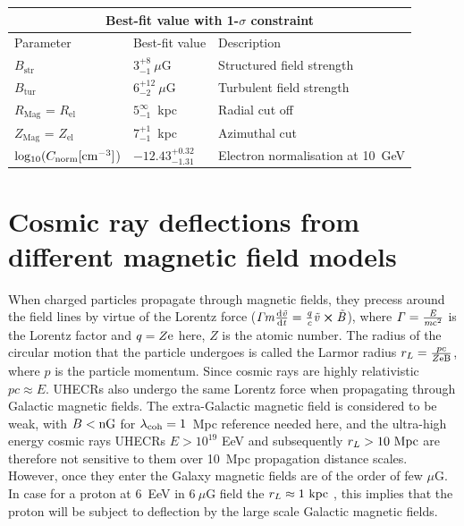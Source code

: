 \documentclass[12pt, a4 paper]{article}
\newcommand{\Andrew}[1]{\textcolor{dg}{#1}}
\begin{document}
\newpage

\label{Para_table}
\begin{center}
\begin{tabular}{ |p{}|p{4.5cm}|p{6.5cm}|  }
\hline
\multicolumn{3}{|c|}{Best-fit value with 1-$\sigma$ constraint} \\
\hline
Parameter & Best-fit value &Description \\
\hline
\hline
$B_{\mathrm{str}} $& $3_{-1}^{+8} ~ \mu$G & Structured field strength \\
\hline
$B_{\mathrm{tur}} $& $ 6_{-2}^{+12} ~\mu$G & Turbulent field strength\\
\hline
$R_{\mathrm{Mag}}$ = $R_{\mathrm{el}}$ & $5_{-1}^{\infty}$~kpc & Radial cut off \\
\hline
$Z_{\mathrm{Mag}}$ = $Z_{\mathrm{el}}$ & $7_{-1}^{+1}$~kpc & Azimuthal cut\\
\hline
\rule{0pt}{3ex} 
${\rm{log_{10}}}(C_{\rm norm} [{\rm cm}^{-3}]$) & ${-12.43}_{{-1.31}}^{{+0.32}}$ & Electron normalisation at 10~GeV\\
\hline
\end{tabular}

\end{center}


\section{Cosmic ray deflections from different magnetic field models}
\label{Deflections}

When charged particles propagate through magnetic fields, they precess around the field lines by virtue of the Lorentz force ($\it{\Gamma} m \frac{{\rm d}\vec{v}}{{\rm d}t} = \frac{q}{c} \vec{v}\cross \vec{B}$), where $\it{\Gamma} = \frac{E}{m\rm c^2}$ is the Lorentz factor and $q = Z \rm e$ here, $Z$ is the atomic number. 
The radius of the circular motion that the particle undergoes is called the Larmor radius $r_L = \frac{pc}{Z\rm {e}B}$, where $p$ is the particle momentum. Since cosmic rays are highly relativistic $pc\approx E$. 
UHECRs also undergo the same Lorentz force when propagating through Galactic magnetic fields. The extra-Galactic magnetic field is considered to be weak, with $B < \rm {nG}$ for $\lambda_{\rm coh}=1$~Mpc \cite{Arjen_2021} \Andrew{reference needed here}, and the ultra-high energy cosmic rays UHECRs $E > 10^{19}$ EeV and subsequently $r_{L}>{\rm 10~Mpc}$ are therefore not sensitive to them over 10~Mpc propagation distance scales. However, once they enter the Galaxy magnetic fields are of the order of few $\mu$G. In case for a proton at 6~EeV in $6~\mu$G field the $r_L \approx 1 ~ \rm kpc$ , this implies that the proton will be subject to deflection by the large scale Galactic magnetic fields.
\end{document}

